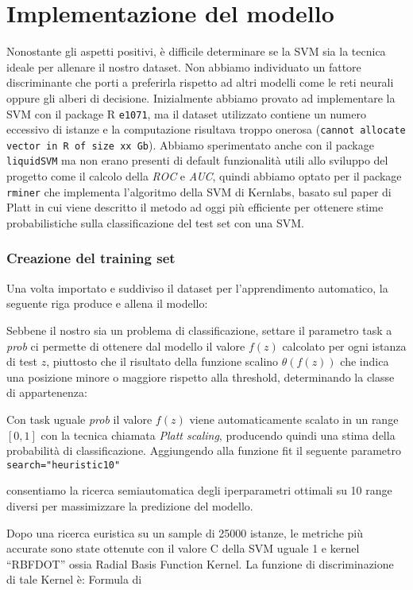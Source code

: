 \section{Implementazione del modello}

Nonostante gli aspetti positivi, è difficile determinare se la SVM sia la tecnica ideale per allenare il nostro dataset. Non abbiamo individuato un fattore discriminante che porti a preferirla rispetto ad altri modelli come le reti neurali oppure gli alberi di decisione.
Inizialmente abbiamo provato ad implementare la SVM con il package R \texttt{e1071}, ma il dataset utilizzato contiene un numero eccessivo di istanze e la computazione risultava troppo onerosa (\texttt{cannot allocate vector in R of size xx Gb}). Abbiamo sperimentato anche con il package \texttt{liquidSVM} ma non erano presenti di default funzionalità utili allo sviluppo del progetto come il calcolo della \textit{ROC} e \textit{AUC}, quindi abbiamo optato per il package \texttt{rminer} che implementa l’algoritmo della SVM di Kernlabs, basato sul paper di Platt \cite{Platt99probabilisticoutputs} in cui viene descritto il metodo ad oggi più efficiente per ottenere stime probabilistiche sulla classificazione del test set con una SVM.

\subsubsection{Creazione del training set}

Una volta importato e suddiviso il dataset per l’apprendimento automatico, la seguente riga produce e allena il modello:

\texttt{}


Sebbene il nostro sia un problema di classificazione, settare il parametro task a \textit{prob} ci permette di ottenere dal modello il valore $ f(z) $ calcolato per ogni istanza di test $z$, piuttosto che il risultato della funzione scalino $\theta(f(z))$ che indica una posizione minore o maggiore rispetto alla threshold, determinando la classe di appartenenza:




Con task uguale \textit{prob} il valore $f(z)$ viene automaticamente scalato in un range $[0, 1]$ con la tecnica chiamata \textit{Platt scaling}, producendo quindi una stima della probabilità di classificazione.
Aggiungendo alla funzione fit il seguente parametro \texttt{search="heuristic10"}

consentiamo la ricerca semiautomatica degli iperparametri ottimali su 10 range diversi per massimizzare la predizione del modello.

Dopo una ricerca euristica su un sample di 25000 istanze, le metriche più accurate sono state ottenute con il valore C della SVM uguale 1 e kernel “RBFDOT” ossia Radial Basis Function Kernel.
La funzione di discriminazione di tale Kernel è:
Formula di 


